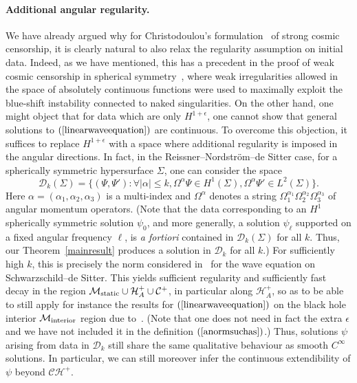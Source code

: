 \documentclass[A4,10pt]{article}
\begin{document}
\paragraph{Additional angular regularity.}
We have already argued why for Christodoulou's formulation~\cite{Chr} 
of strong cosmic censorship,
it is clearly natural to also relax the regularity assumption on initial data.
Indeed, as we have mentioned, this has a precedent in the proof of weak cosmic censorship in spherical
symmetry~\cite{Christodoulou4}, where weak irregularities allowed in the
space of absolutely continuous functions were used
to maximally exploit the blue-shift instability connected to naked singularities.
On the other hand, one might object that for data which are only $H^{1+\epsilon}$,
one cannot show that general solutions to $(\ref{linearwaveequation})$ are continuous. 
To overcome this objection, it suffices to replace $H^{1+\epsilon}$ with a space where
additional regularity is imposed in the angular directions. In fact, 
in the Reissner--Nordstr\"om--de Sitter case, for a spherically symmetric hypersurface $\Sigma$, 
one can consider the space 
\begin{equation}
\label{anormsuchas}
\mathcal{D}_k(\Sigma)=\{(\Psi,\Psi'): \forall|\alpha|\le k,
\Omega^\alpha\Psi\in H^1(\Sigma), \Omega^\alpha\Psi'\in L^2(\Sigma)\}.
\end{equation}
Here $\alpha=(\alpha_1,\alpha_2,\alpha_3)$ is a multi-index and
$\Omega^\alpha$ denotes a string $\Omega_1^{\alpha_1}\Omega_2^{\alpha_2}\Omega_3^{\alpha_3}$
of angular momentum operators.
(Note that the data corresponding to an $H^1$ spherically symmetric solution $\psi_0$, and more generally, a solution $\psi_\ell$
supported on a fixed angular frequency $\ell$, is \emph{a fortiori} contained in 
$\mathcal{D}_k(\Sigma)$ for all $k$. Thus, our Theorem~\ref{mainresult} 
produces a solution
in $\mathcal{D}_k$ for all $k$.) 
For sufficiently high $k$,  this is precisely the norm considered
in~\cite{Dafermos:2007jd} for the wave equation on Schwarzschild--de Sitter.
This yields 
sufficient regularity and sufficiently fast decay in the region $\mathcal{M}_{\rm static}\cup
\mathcal{H}^+_A\cup\mathcal{C}^+$, in particular
along $\mathcal{H}^+_A$, so as to be able to  still apply for instance the results for 
$(\ref{linearwaveequation})$
on the black hole interior $\mathcal{M}_{\rm interior}$ region due 
to~\cite{annefranzen}.
(Note that one does not need in fact the extra $\epsilon$ and we have not included
it in the definition $(\ref{anormsuchas})$.)
Thus, solutions $\psi$ arising from data in $\mathcal{D}_k$ 
still share the same qualitative behaviour as smooth $C^\infty$ solutions. 
In particular, 
we can still moreover infer the continuous 
extendibility of $\psi$ beyond $\mathcal{CH}^+$.
\end{document}
